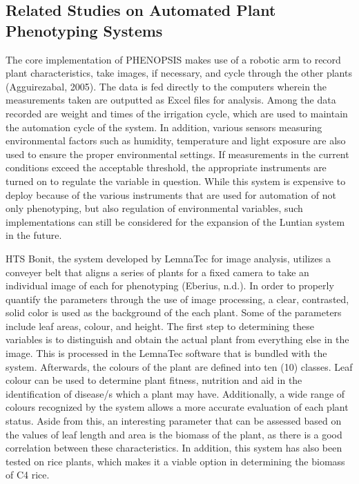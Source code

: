 \subsection{Related Studies on Automated Plant Phenotyping Systems}
\label{sec:mobilecomputing}

The core implementation of PHENOPSIS makes use of a robotic arm to record plant characteristics, take images, if necessary, and cycle through the other plants (Agguirezabal, 2005). The data is fed directly to the computers wherein the measurements taken are outputted as Excel files for analysis. Among the data recorded are weight and times of the irrigation cycle, which are used to maintain the automation cycle of the system. In addition, various sensors measuring environmental factors such as humidity, temperature and light exposure are also used to ensure the proper environmental settings. If measurements in the current conditions exceed the acceptable threshold,  the appropriate instruments are turned on to regulate the variable in question. While this system is expensive to deploy because of the various instruments that are used for automation of not only phenotyping, but also regulation of environmental variables, such implementations can still be considered  for the expansion of the Luntian system  in the future.

HTS Bonit, the system developed by LemnaTec for image analysis, utilizes a conveyer belt that aligns a series of plants for a fixed camera to take an individual image of each for phenotyping (Eberius, n.d.). In order to properly quantify the parameters through the use of image processing, a clear, contrasted, solid color is used as the background of the each plant. Some of the parameters include leaf areas, colour, and height. The first step to determining these variables is to distinguish and obtain the actual plant from everything else in the image. This is processed in the LemnaTec software that is bundled with the system. Afterwards, the colours of the plant are defined into ten (10) classes. Leaf colour can be used to determine plant fitness, nutrition and aid in the identification of disease/s which a plant may have. Additionally, a wide range of colours recognized by the system allows a more accurate evaluation of each plant status. Aside from this, an interesting parameter that can be assessed based on the values of leaf length and area is the biomass of the plant, as there is a good correlation between these characteristics. In addition, this system has also been tested on rice plants, which makes it a viable option in determining the biomass of C4 rice.

